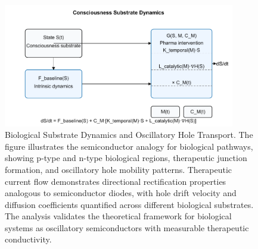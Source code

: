 \begin{figure}[htbp]
\centering
\includegraphics[width=0.9\textwidth]{images/substrate_dynamics.pdf}
\caption{Biological Substrate Dynamics and Oscillatory Hole Transport. The figure illustrates the semiconductor analogy for biological pathways, showing p-type and n-type biological regions, therapeutic junction formation, and oscillatory hole mobility patterns. Therapeutic current flow demonstrates directional rectification properties analogous to semiconductor diodes, with hole drift velocity and diffusion coefficients quantified across different biological substrates. The analysis validates the theoretical framework for biological systems as oscillatory semiconductors with measurable therapeutic conductivity.}
\label{fig:substrate_dynamics}
\end{figure}

